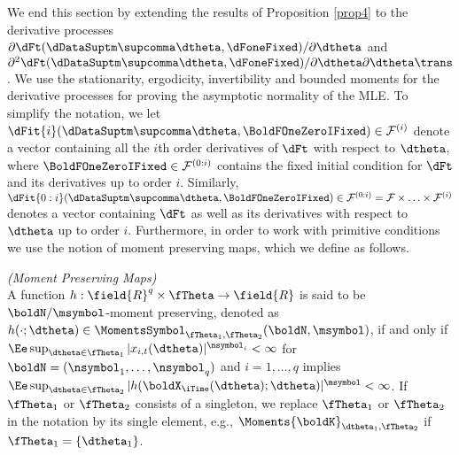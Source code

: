 We end this section by extending the results of Proposition \ref{prop4} to the derivative processes 
$\partial\dFt(\dDataSuptm\supcomma\dtheta,\dFoneFixed)/\partial\dtheta$
and
$\partial^2\dFt(\dDataSuptm\supcomma\dtheta,\dFoneFixed)/\partial\dtheta\partial\dtheta\trans$. We use the stationarity, ergodicity, invertibility and bounded moments for the derivative processes for proving the asymptotic normality of the MLE. 
To simplify the notation, we let $\dFit{i}(\dDataSuptm\supcomma\dtheta,\BoldFOneZeroIFixed) \in \mathcal{F}^{(i)}$ denote a vector containing all the $i$th order derivatives of $\dFt$ with respect to $\dtheta$, where $\BoldFOneZeroIFixed \in \mathcal{F}^{(0:i)}$ contains the fixed initial condition for $\dFt$ and its derivatives up to order $i$.
Similarly, $\dFit{0:i}(\dDataSuptm\supcomma\dtheta,\BoldFOneZeroIFixed) \in \mathcal{F}^{(0:i)} = \mathcal{F} \times \ldots \times \mathcal{F}^{(i)}$ denotes a vector containing $\dFt$ as well as its derivatives with respect to $\dtheta$ up to order $i$.
Furthermore, in order to work with primitive conditions we use the notion of moment preserving maps, which we define as follows.


\begin{defn}    \label{def1} 
    \emph{(Moment Preserving Maps)}\\
A function 
$h: \field{R}^{q} \times \fTheta \to \field{R}$  
is said to be $\boldN/\msymbol$-moment preserving, denoted as
$h(\cdot;\dtheta) \in \MomentsSymbol_{\fTheta_1,\fTheta_2} (\boldN,\msymbol)$, 
if and only if 
$\Ee \sup_{\dtheta \in \fTheta_1} |x_{i,t}(\dtheta)|^{\nsymbol_{i}}<\infty$
for
$\boldN = (\nsymbol_{1},\ldots,\nsymbol_{q})$
and
$i=1,\ldots,q$ implies 
$\Ee \sup_{\dtheta \in \fTheta_2} |h(\boldX_{\iTime}(\dtheta);\dtheta)|^{\msymbol}<\infty$.
If $\fTheta_1$ or $\fTheta_2$ consists of a singleton, we replace $\fTheta_1$ or $\fTheta_2$ in the notation by its single element, e.g., 
$\Moments{\boldK}_{\dtheta_1,\fTheta_2}$ 
if $\fTheta_1 = \{\dtheta_1\}$.
\end{defn}


